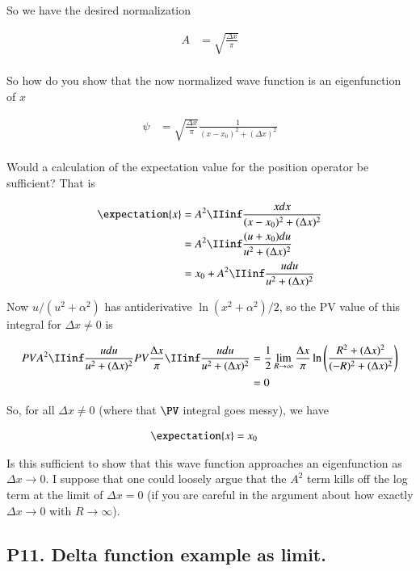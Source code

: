 \documentclass{article}
\begin{document}
So we have the desired normalization

\begin{align*}
A &= \sqrt{\frac{\Delta x}{\pi}} \\
\end{align*}

So how do you show that the now normalized wave function is an eigenfunction of $x$ 

\begin{align*}
\psi &= \sqrt{\frac{\Delta x}{\pi}} \frac{1}{(x-x_0)^2 + (\Delta x)^2} \\
\end{align*}

Would a calculation of the expectation value for the position operator be sufficient?  That is

\begin{align*}
\expectation{x} 
&= A^2 \IIinf \frac{x dx }{(x-x_0)^2 + (\Delta x)^2} \\
&= A^2 \IIinf \frac{(u + x_0) du }{u^2 + (\Delta x)^2} \\
&= x_0 + A^2 \IIinf \frac{u du }{u^2 + (\Delta x)^2} \\
\end{align*}

Now $u/(u^2 + \alpha^2)$ has antiderivative $\ln(x^2 + \alpha^2)/2$, so the PV value of this integral for $\Delta x \ne 0$
is

\begin{align*}
PV A^2 \IIinf \frac{u du }{u^2 + (\Delta x)^2} 
PV \frac{\Delta x}{\pi} \IIinf \frac{u du }{u^2 + (\Delta x)^2} 
&= \inv{2} \lim_{R\rightarrow \infty} \frac{\Delta x}{\pi} \ln\left( \frac{R^2 + (\Delta x)^2}{(-R)^2 + (\Delta x)^2} \right) \\
&= 0
\end{align*}

So, for all $\Delta x \ne 0$ (where that $\PV$ integral goes messy), we have

\begin{align*}
\expectation{x} &= x_0 
\end{align*}

Is this sufficient to show that this wave function approaches an eigenfunction as $\Delta x \rightarrow 0$.
I suppose that one could loosely argue that the $A^2$ term kills off the log term at the limit of $\Delta x = 0$ (if you are careful in the argument about how exactly $\Delta x \rightarrow 0$ with $R \rightarrow \infty$).

\subsection{P11. Delta function example as limit. }
\end{document}
